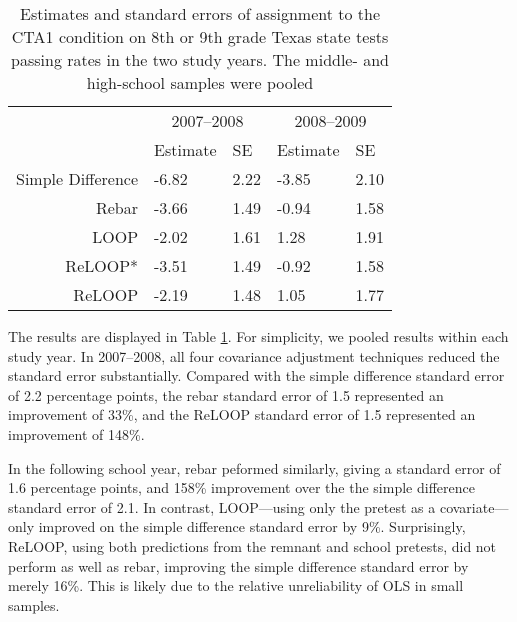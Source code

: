 \begin{table}[ht]
\centering
\begin{tabular}{rll|ll}
   &\multicolumn{2}{c}{2007--2008}&\multicolumn{2}{c}{2008--2009}\\ 
 &Estimate&SE&Estimate&SE\\ 
 \hline
Simple Difference & -6.82 & 2.22 & -3.85 & 2.10 \\ 
  Rebar & -3.66 & 1.49 & -0.94 & 1.58 \\ 
  LOOP & -2.02 & 1.61 & 1.28 & 1.91 \\ 
  ReLOOP* & -3.51 & 1.49 & -0.92 & 1.58 \\ 
  ReLOOP & -2.19 & 1.48 & 1.05 & 1.77 \\ 
   \hline
\end{tabular}
\caption{Estimates and standard errors of assignment to the CTA1 condition on 8th or 9th grade Texas state tests passing rates in the two study years. The middle- and high-school samples were pooled} 
\label{tab:resultsCT}
\end{table}


The results are displayed in Table \ref{tab:resultsCT}.
For simplicity, we pooled results within each study year.
In 2007--2008, all four covariance adjustment techniques reduced the
standard error substantially. Compared with the simple difference
standard error of 2.2 percentage points,
the rebar standard error of 1.5
represented an improvement of 33\%, and
the ReLOOP standard error of 1.5
represented an improvement of 148\%.

In the following school year, rebar peformed similarly, giving a
standard error of 1.6 percentage points, and
158\% improvement over the the simple
difference standard error of 2.1.
In contrast, LOOP---using only the pretest as a covariate---only
improved on the simple difference standard error by
9\%.
Surprisingly, ReLOOP, using both predictions from the remnant and
school pretests, did not perform as well as rebar, improving the
simple difference standard error by merely
16\%.
This is likely due to the relative unreliability of OLS in small samples.
